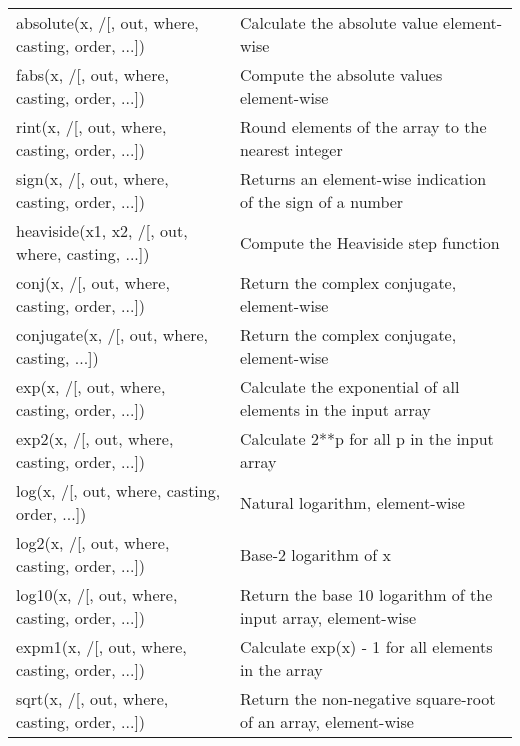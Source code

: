 \documentclass[a4paper,11pt]{book}
\numberwithin{figure}{chapter}
\numberwithin{table}{chapter}
\begin{document}
\begin{appendices}
\begin{table}[!htbp]
\begin{tabular}{lp{8.5cm}}
absolute(x, /[, out, where, casting, order, ...])
& Calculate the absolute value element-wise\\
fabs(x, /[, out, where, casting, order, ...])
& Compute the absolute values element-wise\\
rint(x, /[, out, where, casting, order, ...])
& Round elements of the array to the nearest integer\\
sign(x, /[, out, where, casting, order, ...])
& Returns an element-wise indication of the sign of a number\\
heaviside(x1, x2, /[, out, where, casting, ...])
& Compute the Heaviside step function\\
conj(x, /[, out, where, casting, order, ...])
& Return the complex conjugate, element-wise\\
conjugate(x, /[, out, where, casting, ...])
& Return the complex conjugate, element-wise\\
exp(x, /[, out, where, casting, order, ...])
& Calculate the exponential of all elements in the input array\\
exp2(x, /[, out, where, casting, order, ...])
& Calculate 2**p for all p in the input array\\
log(x, /[, out, where, casting, order, ...])
& Natural logarithm, element-wise\\
log2(x, /[, out, where, casting, order, ...])
& Base-2 logarithm of x\\
log10(x, /[, out, where, casting, order, ...])
& Return the base 10 logarithm of the input array, element-wise\\
expm1(x, /[, out, where, casting, order, ...])
& Calculate exp(x) - 1 for all elements in the array\\
sqrt(x, /[, out, where, casting, order, ...])
& Return the non-negative square-root of an array, element-wise\\
\bottomrule
\end{tabular}
\end{table}
\clearpage


\end{appendices}
\end{document}
